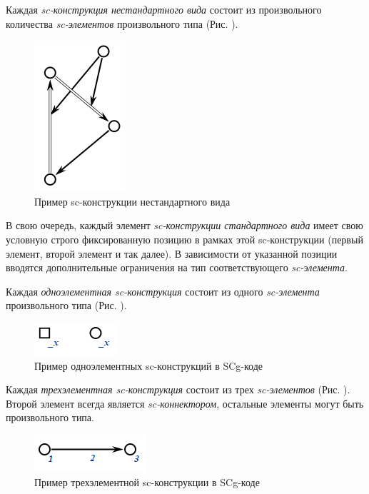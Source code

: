 Каждая \textit{sc-конструкция нестандартного вида} состоит из произвольного количества \textit{sc-элементов} произвольного типа (Рис. \textit{}).

\begin{figure}[H]
	\centering
	\includegraphics[scale=0.8]{images/part3/chapter_situation_management/pic_ps1.png}
	\caption{Пример sc-конструкции нестандартного вида}
	\label{fig:pic_ps1}
\end{figure}

В свою очередь, каждый элемент \textit{\mbox{sc-конструкции} стандартного вида} имеет свою условную строго фиксированную позицию в рамках этой \mbox{sc-конструкции} (первый элемент, второй элемент и так далее). В зависимости от указанной позиции вводятся дополнительные ограничения на тип соответствующего \textit{sc-элемента}.

Каждая \textit{одноэлементная sc-конструкция} состоит из одного \textit{sc-элемента} произвольного типа (Рис. \textit{}).

\begin{figure}[H]
	\centering
	\includegraphics[scale=0.8]{images/part3/chapter_situation_management/pic_ps2.png}
	\caption{Пример одноэлементных sc-конструкций в SCg-коде}
	\label{fig:pic_ps2}
\end{figure}

Каждая \textit{трехэлементная sc-конструкция} состоит из трех \textit{sc-элементов} (Рис. \textit{}). Второй элемент всегда является \textit{sc-коннектором}, остальные элементы могут быть произвольного типа.

\begin{figure}[H]
	\centering
	\includegraphics[scale=0.8]{images/part3/chapter_situation_management/pic_ps3.png}
	\caption{Пример трехэлементной sc-конструкции в SCg-коде}
	\label{fig:pic_ps3}
\end{figure}

